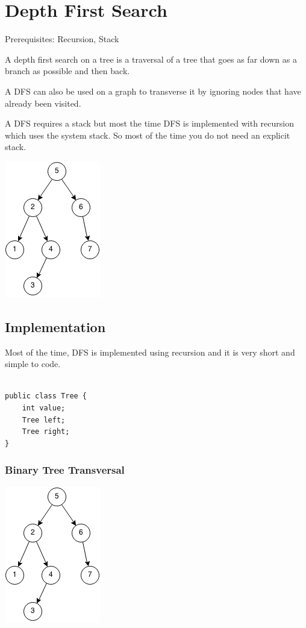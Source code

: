 \documentclass[11pt,oneside]{book}
\makeatletter
\def\maxwidth#1{\ifdim\Gin@nat@width>#1 #1\else\Gin@nat@width\fi}
\makeatother
\begin{document}
        \section{ Depth First Search }
        

Prerequisites: Recursion, Stack

A depth first search on a tree is a traversal of a tree that goes as far down as a branch as possible and then back.

A DFS can also be used on a graph to transverse it by ignoring nodes that have already been visited.

A DFS requires a stack but most the time DFS is implemented with recursion which uses the system stack. So most of the time you do not need an explicit stack.

\vspace{5px}\includegraphics[width=\maxwidth{\textwidth}]{dfs.png}

\subsection{Implementation}

Most of the time, DFS is implemented using recursion and it is very short and simple to code.

\begin{lstlisting}

public class Tree {
    int value;
    Tree left;
    Tree right;
}
\end{lstlisting}

\subsubsection{Binary Tree Transversal}

\vspace{5px}\includegraphics[width=\maxwidth{\textwidth}]{dfs.png}
\end{document}
